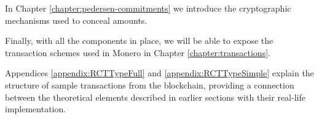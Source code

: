 In Chapter \ref{chapter:pedersen-commitments} we introduce the cryptographic mechanisms used to conceal amounts.

Finally, with all the components in place, we will be able to expose the transaction schemes used in Monero in Chapter \ref{chapter:transactions}.




Appendices \ref{appendix:RCTTypeFull} and \ref{appendix:RCTTypeSimple} explain the structure of sample transactions from the blockchain, providing a connection between the theoretical elements described in earlier sections with their real-life implementation.